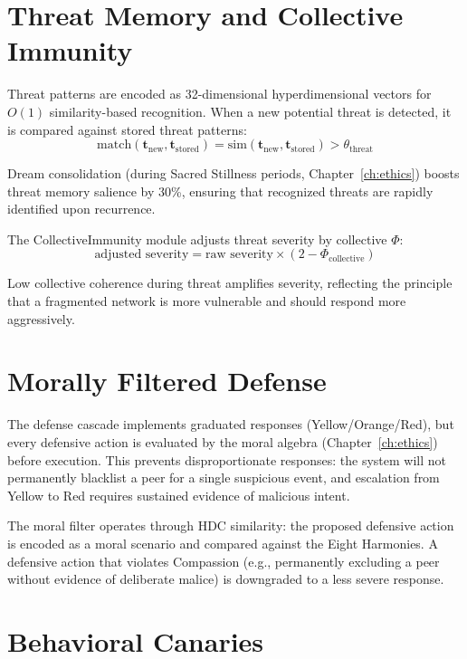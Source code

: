 \documentclass[12pt]{book}
\begin{document}
\section{Threat Memory and Collective Immunity}

Threat patterns are encoded as 32-dimensional hyperdimensional vectors for $O(1)$ similarity-based recognition. When a new potential threat is detected, it is compared against stored threat patterns:
\begin{equation}
\text{match}(\mathbf{t}_{\text{new}}, \mathbf{t}_{\text{stored}}) = \text{sim}(\mathbf{t}_{\text{new}}, \mathbf{t}_{\text{stored}}) > \theta_{\text{threat}}
\end{equation}

Dream consolidation (during Sacred Stillness periods, Chapter~\ref{ch:ethics}) boosts threat memory salience by 30\%, ensuring that recognized threats are rapidly identified upon recurrence.

The CollectiveImmunity module adjusts threat severity by collective $\Phi$:
\begin{equation}
\text{adjusted severity} = \text{raw severity} \times (2 - \Phi_{\text{collective}})
\end{equation}

Low collective coherence during threat amplifies severity, reflecting the principle that a fragmented network is more vulnerable and should respond more aggressively.

\section{Morally Filtered Defense}

The defense cascade implements graduated responses (Yellow/Orange/Red), but every defensive action is evaluated by the moral algebra (Chapter~\ref{ch:ethics}) before execution. This prevents disproportionate responses: the system will not permanently blacklist a peer for a single suspicious event, and escalation from Yellow to Red requires sustained evidence of malicious intent.

The moral filter operates through HDC similarity: the proposed defensive action is encoded as a moral scenario and compared against the Eight Harmonies. A defensive action that violates Compassion (e.g., permanently excluding a peer without evidence of deliberate malice) is downgraded to a less severe response.

\section{Behavioral Canaries}
\end{document}

